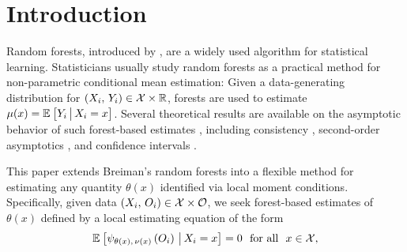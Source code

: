 \documentclass[aos]{imsart}
\theoremstyle{plain}
\theoremstyle{definition}
\theoremstyle{remark}
\begin{document}
\begin{CJK}{UTF8}{gbsn}
\begin{frontmatter}
\end{frontmatter}

\section{Introduction}

Random forests, introduced by \citet{breiman2001random}, are a widely used algorithm for statistical learning.
Statisticians usually study random forests as a practical method for non-parametric conditional mean estimation:
Given a data-generating distribution for $(X_i, \, Y_i) \in \mathcal{X} \times \mathbb{R}$, forests are used to estimate
$\mu(x) = \mathbb{E}_{}\left[Y_i \,\big|\, X_i = x\right]$.
Several theoretical results are available on the asymptotic behavior of such forest-based
estimates , including consistency
\citep{arlot2014analysis,biau2008consistency,biau2012analysis,denil2014narrowing,lin2006random,
scornet2015consistency,wager2015uniform},
second-order asymptotics \citep{mentch2016quantifying},
and confidence intervals \citep{wager2015estimation}.

This paper extends Breiman's random forests into a flexible
method for estimating any quantity $\theta(x)$ identified via local moment conditions. Specifically,
given data $(X_i, \, O_i) \in \mathcal{X} \times \mathcal{O}$, we seek forest-based estimates of $\theta(x)$ defined by a local
estimating equation of the form
\begin{equation}
\label{eq:conditional_theta}
\EE{\psi_{\theta(x), \, \nu(x)}\p{O_i} \cond X_i = x} = 0 \ \text{ for all } \ x \in \xx, 
\end{equation}


\end{CJK}
\end{document}
